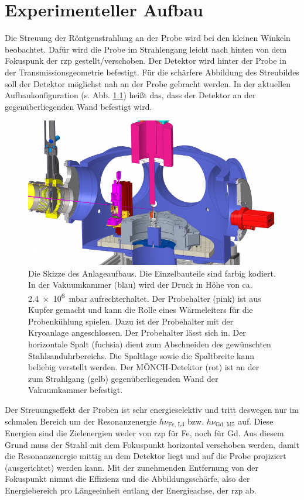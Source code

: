 \chapter{Experimenteller Aufbau}
Die Streuung der Röntgenstrahlung an der Probe wird bei den kleinen Winkeln beobachtet. Dafür wird die Probe im Strahlengang leicht nach hinten von dem Fokuspunk der \gls{rzp} gestellt/verschoben. Der Detektor wird hinter der Probe in der Transmissionsgeometrie befestigt. Für die schärfere Abbildung des Streubildes soll der Detektor möglichst nah an der Probe gebracht werden. In der aktuellen Aufbaukonfiguration (s. Abb. \ref{fig:anlage}) heißt das, dass der Detektor an der gegenüberliegenden Wand befestigt wird.  
\begin{figure}[H]
    \centering
    \includegraphics{images/aufbau/aufbau_empty.pdf}
    \caption{Die Skizze des Anlageaufbaus. Die Einzelbauteile sind farbig kodiert. In der Vakuumkammer (blau) wird der Druck in Höhe von ca. \SI{2.4e6}{\milli\bar} aufrechterhaltet. Der Probehalter (pink) ist aus Kupfer gemacht und kann die Rolle eines Wärmeleiters für die Probenkühlung spielen. Dazu ist der Probehalter mit der Kryoanlage angeschlossen. Der Probehalter lässt sich in. Der horizontale Spalt (fuchsia) dient zum Abschneiden des gewünschten Stahlsanduhrbereichs. Die Spaltlage sowie die Spaltbreite kann beliebig verstellt werden. Der MÖNCH-Detektor (rot) ist an der zum Strahlgang (gelb) gegenüberliegenden Wand der Vakuumkammer befestigt.}
    \label{fig:anlage}
\end{figure}
\noindent
Der Streuungseffekt der Proben ist sehr energieselektiv und tritt deswegen nur im schmalen Bereich um der Resonanzenergie $h\nu_{\text{Fe, L3}}$ bzw. $h\nu_{\text{Gd, M5}}$ auf. Diese Energien sind die Zielenergien weder von \gls{rzp} für Fe, noch für Gd. Aus diesem Grund muss der Strahl mit dem Fokuspunkt horizontal verschoben werden, damit die Resonanzenergie mittig an dem Detektor liegt und auf die Probe projiziert (ausgerichtet) werden kann. Mit der zunehmenden Entfernung von der Fokuspunkt nimmt die Effizienz und die Abbildungsschärfe, also der Energiebereich pro Längeeinheit entlang der Energieachse, der \gls{rzp} ab.

